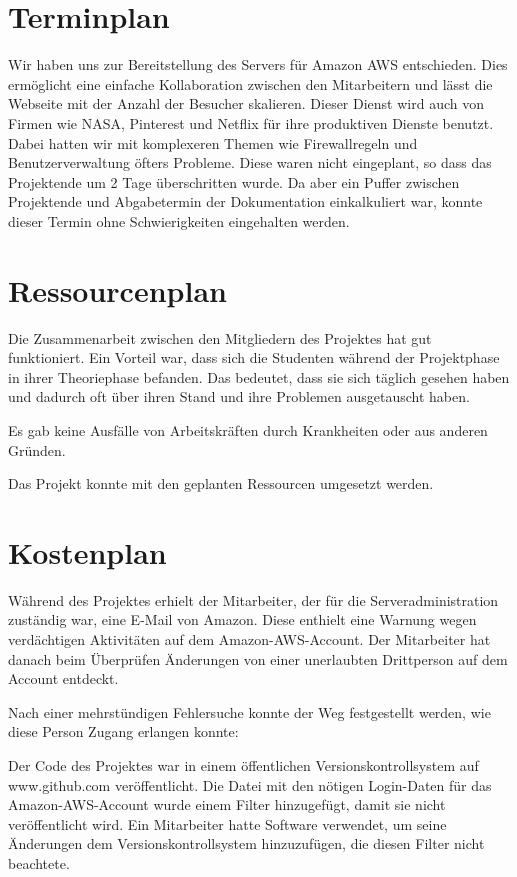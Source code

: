 \documentclass{article}
\begin{document}
\section{Terminplan}
Wir haben uns zur Bereitstellung des Servers für Amazon AWS entschieden. Dies ermöglicht eine einfache Kollaboration zwischen den Mitarbeitern und lässt die Webseite mit der Anzahl der Besucher skalieren. Dieser Dienst wird auch von Firmen wie NASA, Pinterest und Netflix für ihre produktiven Dienste benutzt.
Dabei hatten wir mit komplexeren Themen wie Firewallregeln und Benutzerverwaltung öfters Probleme. Diese waren nicht eingeplant, so dass das Projektende um 2 Tage überschritten wurde. Da aber ein Puffer zwischen Projektende und Abgabetermin der Dokumentation einkalkuliert war, konnte dieser Termin ohne Schwierigkeiten eingehalten werden.


\section{Ressourcenplan}
Die Zusammenarbeit zwischen den Mitgliedern des Projektes hat gut funktioniert. Ein Vorteil war, dass sich die Studenten während der Projektphase in ihrer Theoriephase befanden. Das bedeutet, dass sie sich täglich gesehen haben und dadurch oft über ihren Stand und ihre Problemen ausgetauscht haben.

\smallskip
\noindent Es gab keine Ausfälle von Arbeitskräften durch Krankheiten oder aus anderen Gründen.

\smallskip
\noindent Das Projekt konnte mit den geplanten Ressourcen umgesetzt werden.

\section{Kostenplan}

Während des Projektes erhielt der Mitarbeiter, der für die Serveradministration zuständig war, eine E-Mail von Amazon. Diese enthielt eine Warnung wegen verdächtigen Aktivitäten auf dem Amazon-AWS-Account. Der Mitarbeiter hat danach beim Überprüfen Änderungen von einer unerlaubten Drittperson auf dem Account entdeckt.

Nach einer mehrstündigen Fehlersuche konnte der Weg festgestellt werden, wie diese Person Zugang erlangen konnte: 

Der Code des Projektes war in einem öffentlichen Versionskontrollsystem auf www.github.com veröffentlicht. Die Datei mit den nötigen Login-Daten für das Amazon-AWS-Account wurde einem Filter hinzugefügt, damit sie nicht veröffentlicht wird. Ein Mitarbeiter hatte Software verwendet, um seine Änderungen dem Versionskontrollsystem hinzuzufügen, die diesen Filter nicht beachtete.
\end{document}
